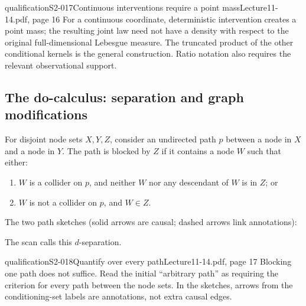 \begin{reviewnote}{qualification}{S2-017}{Continuous interventions require a point mass}{Lecture11-14.pdf, page 16}
For a continuous coordinate, deterministic intervention creates a point mass; the resulting joint law need not have a density with respect to the original full-dimensional Lebesgue measure. The truncated product of the other conditional kernels is the general construction. Ratio notation also requires the relevant observational support.
\end{reviewnote}


\subsection{The do-calculus: separation and graph modifications}
For disjoint node sets $X,Y,Z$, consider an undirected path $p$ between a node in $X$ and a node in $Y$. The path is blocked by $Z$ if it contains a node $W$ such that either:
\begin{enumerate}
 \item $W$ is a collider on $p$, and neither $W$ nor any descendant of $W$ is in $Z$; or
 \item $W$ is not a collider on $p$, and $W\in Z$.
\end{enumerate}
The two path sketches (solid arrows are causal; dashed arrows link annotations):
\begin{center}
\end{center}
The scan calls this $d$-separation.
\begin{reviewnote}{qualification}{S2-018}{Quantify over every path}{Lecture11-14.pdf, page 17}
Blocking one path does not suffice. Read the initial ``arbitrary path'' as requiring the criterion for every path between the node sets. In the sketches, arrows from the conditioning-set labels are annotations, not extra causal edges.
\end{reviewnote}


